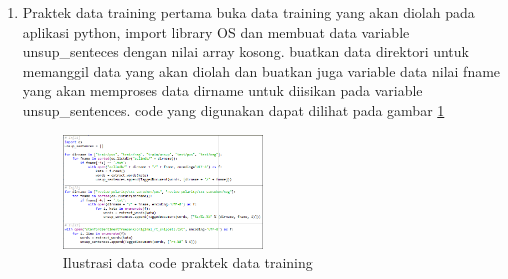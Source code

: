 \begin{enumerate}
\item Praktek data training
\subitem pertama buka data training yang akan diolah pada aplikasi python, import library OS dan membuat data variable unsup\_senteces dengan nilai array kosong. buatkan data direktori untuk memanggil data yang akan diolah dan buatkan juga variable data nilai fname yang akan memproses data dirname untuk diisikan pada variable unsup\_sentences. code yang digunakan dapat dilihat pada gambar \ref{fig21}
\begin{figure}[!htbp]
	\centering
	\includegraphics[width=0.5\textwidth]{figures/fathi/chapter5/hari3/2}
	\caption{Ilustrasi data code praktek data training }
	\label{fig21}
\end{figure}


\end{enumerate}
